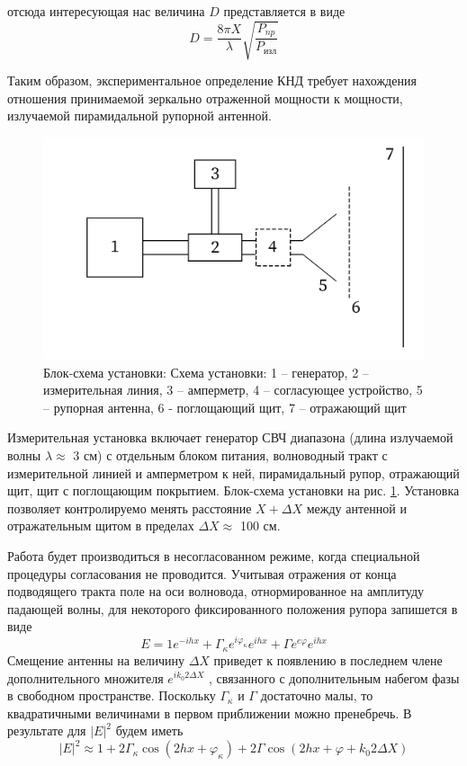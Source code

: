 отсюда интересующая нас величина $D$ представляется в виде 
\begin{equation}
    D = \frac{8\pi X}{\lambda}\sqrt{\frac{P_{np}}{P_{\text{изл}}}}
    \label{eq:8}
\end{equation}

Таким образом, экспериментальное определение КНД требует нахождения отношения принимаемой зеркально отраженной мощности 
к мощности, излучаемой пирамидальной рупорной антенной. 

\begin{figure}[H]
    \centering
    \includegraphics[width = 0.7\linewidth]{imgs/block.png}
    \caption{Блок-схема установки:  Схема установки: 1 – генератор, 2 – измерительная линия, 3 – амперметр, 4 –
    согласующее устройство, 5 – рупорная антенна, 6 - поглощающий щит, 7 – отражающий щит}
    \label{fig:2}
\end{figure}


Измерительная установка включает генератор СВЧ диапазона (длина излучаемой волны $\lambda \approx $ 3 см) с отдельным 
блоком питания, волноводный тракт с измерительной линией и амперметром к ней, пирамидальный рупор, отражающий щит, 
щит с поглощающим покрытием. Блок-схема установки на рис. \ref{fig:2}. 
Установка позволяет контролируемо менять расстояние $X + \Delta X$ между антенной и отражательным щитом в пределах
$\Delta X \approx $  100 см. 

Работа будет производиться в несогласованном режиме, когда специальной процедуры согласования не проводится. 
Учитывая отражения от конца подводящего тракта поле на оси волновода, отнормированное на 
амплитуду падающей волны, для некоторого фиксированного положения рупора запишется в виде
\begin{equation}
    E = 1e^{-ihx}+\Gamma_\kappa e^{i\varphi_\kappa} e^{ihx}+ \Gamma e^{e\varphi} e^{ihx}
    \label{eq:11}
\end{equation}
Смещение антенны на величину $\Delta X$ приведет к появлению в последнем члене дополнительного множителя $ e^{ i k_0
2\Delta X } $ , связанного с дополнительным набегом фазы в свободном пространстве. Поскольку 
$ \Gamma_{\kappa} \text{ и } \Gamma$ достаточно малы, то квадратичными величинами в первом приближении можно 
пренебречь. В результате для $ |E|^2 $ будем иметь 
\begin{equation}
    |E|^{2} \approx 1+2 \Gamma_{\kappa} \cos \left(2 h x+\varphi_{\kappa}\right)+2 \Gamma \cos \left(2 h x+\varphi+k_{0} 2 \Delta X\right)    
    \label{eq:13}
\end{equation}

